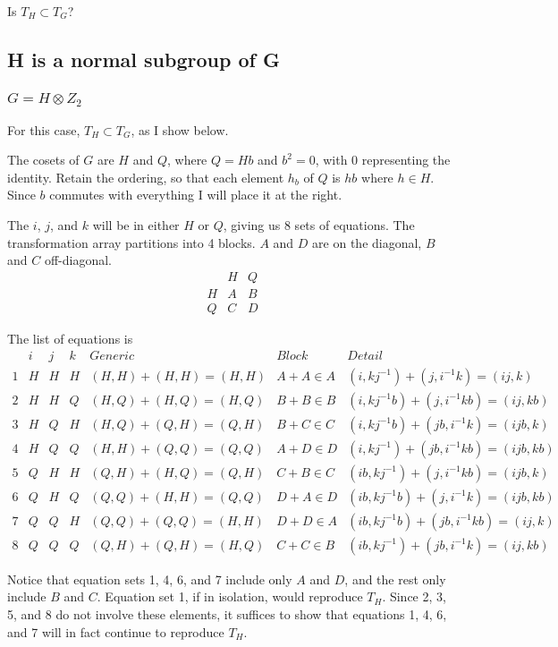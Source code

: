 \documentclass{revtex4-1}
\begin{document}
\par Is $T_H \subset T_G$?

\subsection{H is a normal subgroup of G}

\subsubsection{$G = H \otimes Z_2$}

For this case, $T_H \subset T_G$, as I show below.

\par The cosets of $G$ are $H$ and $Q$, where $Q=Hb$ and $b^2 =0$, with $0$ representing the identity.
Retain the ordering, so that each element $h_b$ of $Q$ is $h b$ where $h \in H$.  Since $b$ commutes
with everything I will place it at the right.

\par The $i$, $j$, and $k$ will be in either $H$ or $Q$, giving us 8 sets of equations.  The transformation
array partitions into 4 blocks.  $A$ and $D$ are on the diagonal, $B$ and $C$ off-diagonal.
$$
\begin{array}{c|c|c}
 & H & Q \\ \hline
H & A & B \\ \hline
Q & C & D
\end{array}
$$

\par The list of equations is
$$
\begin{array}{c|c|c|c|c|c|c}
  & i & j & k & Generic & Block & Detail \\ \hline
1 & H & H & H & (H,H)+(H,H)=(H,H) & A+A \in A & (i,kj^{-1}) + (j,i^{-1}k)=(ij,k) \\ \hline
2 & H & H & Q & (H,Q)+(H,Q)=(H,Q) & B+B \in B & (i,kj^{-1}b) + (j,i^{-1}kb)=(ij,kb) \\ \hline
3 & H & Q & H & (H,Q)+(Q,H)=(Q,H) & B+C \in C & (i,kj^{-1}b) + (jb,i^{-1}k)=(ijb,k) \\ \hline
4 & H & Q & Q & (H,H)+(Q,Q)=(Q,Q) & A+D \in D & (i,kj^{-1}) + (jb,i^{-1}kb)=(ijb,kb) \\ \hline
5 & Q & H & H & (Q,H)+(H,Q)=(Q,H) & C+B \in C & (ib,kj^{-1}) + (j,i^{-1}kb)=(ijb,k) \\ \hline
6 & Q & H & Q & (Q,Q)+(H,H)=(Q,Q) & D+A \in D & (ib,kj^{-1}b) + (j,i^{-1}k)=(ijb,kb) \\ \hline
7 & Q & Q & H & (Q,Q)+(Q,Q)=(H,H) & D+D \in A & (ib,kj^{-1}b) + (jb,i^{-1}kb)=(ij,k) \\ \hline
8 & Q & Q & Q & (Q,H)+(Q,H)=(H,Q) & C+C \in B & (ib,kj^{-1}) + (jb,i^{-1}k)=(ij,kb) 
\end{array}
$$
\par Notice that equation sets 1, 4, 6, and 7 include only $A$ and $D$, and the rest only include
$B$ and $C$.  Equation set 1, if in isolation, would reproduce $T_H$.  Since 2, 3, 5, and 8
do not involve these elements, it suffices to show that equations 1, 4, 6, and 7 will in fact
continue to reproduce $T_H$.
\end{document}
